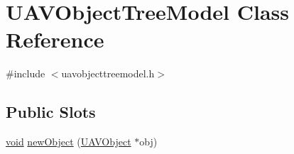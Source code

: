 \hypertarget{class_u_a_v_object_tree_model}{\section{\-U\-A\-V\-Object\-Tree\-Model \-Class \-Reference}
\label{class_u_a_v_object_tree_model}
}


{\ttfamily \#include $<$uavobjecttreemodel.\-h$>$}

\subsection*{\-Public \-Slots}
\begin{DoxyCompactItemize}
\item 
\hyperlink{group___u_a_v_objects_plugin_ga444cf2ff3f0ecbe028adce838d373f5c}{void} \hyperlink{group___u_a_v_object_browser_plugin_gafd9deb057c76e2910dd13055abcbad3e}{new\-Object} (\hyperlink{class_u_a_v_object}{\-U\-A\-V\-Object} $\ast$obj)
\end{DoxyCompactItemize}

